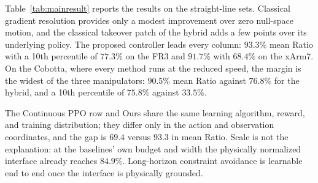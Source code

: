 \documentclass[journal, twoside]{IEEEtran}
\begin{document}
Table~\ref{tab:mainresult} reports the results on the straight-line
sets. Classical gradient resolution provides only a modest improvement
over zero null-space motion, and the classical takeover patch of the
hybrid adds a few points over its underlying policy. The proposed
controller leads every column: $93.3\%$ mean Ratio with a 10th
percentile of $77.3\%$ on the FR3 and $91.7\%$ with $68.4\%$ on the
xArm7. On the Cobotta, where every method runs at the reduced speed,
the margin is the widest of the three manipulators: $90.5\%$ mean Ratio
against $76.8\%$ for the hybrid, and a 10th percentile of $75.8\%$
against $33.5\%$.

The Continuous PPO row and Ours share the same learning algorithm,
reward, and training distribution; they differ only in the action and
observation coordinates, and the gap is $69.4$ versus $93.3$ in mean
Ratio. Scale is not the explanation: at the baselines' own budget and
width the physically normalized interface already reaches $84.9\%$.
Long-horizon constraint avoidance is learnable end to end once the
interface is physically grounded.
\end{document}
